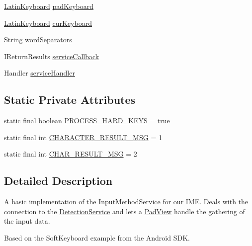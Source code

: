 \begin{DoxyCompactItemize}
\item 
\hyperlink{classch_1_1zhaw_1_1ba10__bsha__1_1_1ime_1_1LatinKeyboard}{LatinKeyboard} \hyperlink{classch_1_1zhaw_1_1ba10__bsha__1_1_1ime_1_1HandwritingIME_a57cdeb14386f227d3588cf221f32e8d0}{padKeyboard}
\item 
\hyperlink{classch_1_1zhaw_1_1ba10__bsha__1_1_1ime_1_1LatinKeyboard}{LatinKeyboard} \hyperlink{classch_1_1zhaw_1_1ba10__bsha__1_1_1ime_1_1HandwritingIME_ac95c3e131d61264247ea2f40b3bd4991}{curKeyboard}
\item 
String \hyperlink{classch_1_1zhaw_1_1ba10__bsha__1_1_1ime_1_1HandwritingIME_a23ac28ca44ad5920e88c7671b7a9f2d1}{wordSeparators}
\item 
IReturnResults \hyperlink{classch_1_1zhaw_1_1ba10__bsha__1_1_1ime_1_1HandwritingIME_a2b00011a3695bc66257dd90aa0ac27ab}{serviceCallback}
\item 
Handler \hyperlink{classch_1_1zhaw_1_1ba10__bsha__1_1_1ime_1_1HandwritingIME_a3c53e6e79323d1574d50d493d76f290d}{serviceHandler}
\end{DoxyCompactItemize}
\subsection*{Static Private Attributes}
\begin{DoxyCompactItemize}
\item 
static final boolean \hyperlink{classch_1_1zhaw_1_1ba10__bsha__1_1_1ime_1_1HandwritingIME_a6807180ab4641e86ea2c94e01ead09a8}{PROCESS\_\-HARD\_\-KEYS} = true
\item 
static final int \hyperlink{classch_1_1zhaw_1_1ba10__bsha__1_1_1ime_1_1HandwritingIME_af6448d252df45f5e4ea520c29ec38d0b}{CHARACTER\_\-RESULT\_\-MSG} = 1
\item 
static final int \hyperlink{classch_1_1zhaw_1_1ba10__bsha__1_1_1ime_1_1HandwritingIME_a4a5e59ff77bc147c35c6cc423e878305}{CHAR\_\-RESULT\_\-MSG} = 2
\end{DoxyCompactItemize}


\subsection{Detailed Description}
A basic implementation of the \hyperlink{}{InputMethodService} for our IME. Deals with the connection to the \hyperlink{}{DetectionService} and lets a \hyperlink{classch_1_1zhaw_1_1ba10__bsha__1_1_1ime_1_1PadView}{PadView} handle the gathering of the input data.

Based on the SoftKeyboard example from the Android SDK. 

